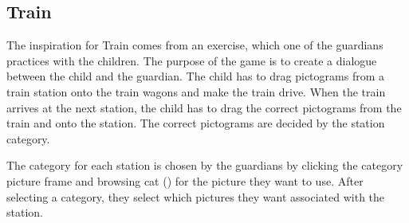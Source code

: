 \subsection{Train}
\label{sub:train}
The inspiration for Train comes from an exercise, which one of the guardians practices with the children. The purpose of the game is to create a dialogue between the child and the guardian. The child has to drag pictograms from a train station onto the train wagons and make the train drive. When the train arrives at the next station, the child has to drag the correct pictograms from the train and onto the station. The correct pictograms are decided by the station category.

The category for each station is chosen by the guardians by clicking the category picture frame and browsing \ac{cat} () for the picture they want to use. After selecting a category, they select which pictures they want associated with the station. %

